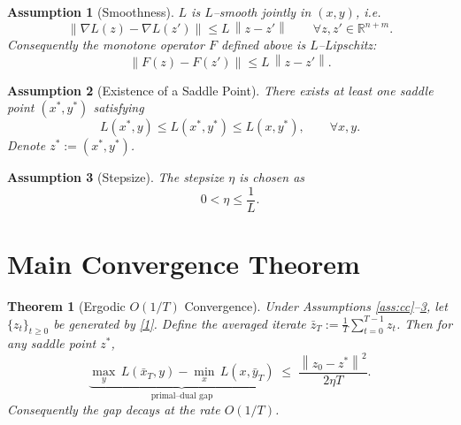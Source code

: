 \documentclass{article}
\newtheorem{theorem}{Theorem}
\newtheorem{assumption}{Assumption}
\newcommand{\norm}[1]{\left\|#1\right\|}
\begin{document}
\begin{assumption}[Smoothness]\label{ass:smooth}
$L$ is $L$–smooth jointly in $(x,y)$, i.e.
\[
\norm{\nabla L(z)-\nabla L(z')} \le L\,\norm{z-z'}\qquad
\forall z,z'\in\mathbb{R}^{n+m}.
\]
Consequently the monotone operator $F$ defined above is $L$–Lipschitz:
\[
\norm{F(z)-F(z')}\le L\,\norm{z-z'}.
\]
\end{assumption}

\begin{assumption}[Existence of a Saddle Point]\label{ass:exist}
There exists at least one saddle point $(x^{*},y^{*})$ satisfying
\[
L(x^{*},y)\le L(x^{*},y^{*})\le L(x,y^{*}),\qquad\forall x,y.
\]
Denote $z^{*}:=(x^{*},y^{*})$.
\end{assumption}

\begin{assumption}[Stepsize]\label{ass:step}
The stepsize $\eta$ is chosen as
\[
0<\eta\le\frac{1}{L}.
\]
\end{assumption}

\section*{Main Convergence Theorem}
\begin{theorem}[Ergodic $O(1/T)$ Convergence]\label{thm:main}
Under Assumptions \ref{ass:cc}–\ref{ass:step}, let $\{z_{t}\}_{t\ge0}$ be generated by \eqref{1}.  
Define the averaged iterate $\bar z_{T}:=\frac{1}{T}\sum_{t=0}^{T-1}z_{t}$.  
Then for any saddle point $z^{*}$,
\[
\underbrace{\max_{y}\,L(\bar x_{T},y)-\min_{x}\,L(x,\bar y_{T})}_{\displaystyle\text{primal–dual gap}}
\;\le\;
\frac{\norm{z_{0}-z^{*}}^{2}}{2\eta T}.
\tag{3}
\]
Consequently the gap decays at the rate $O(1/T)$.
\end{theorem}
\end{document}
